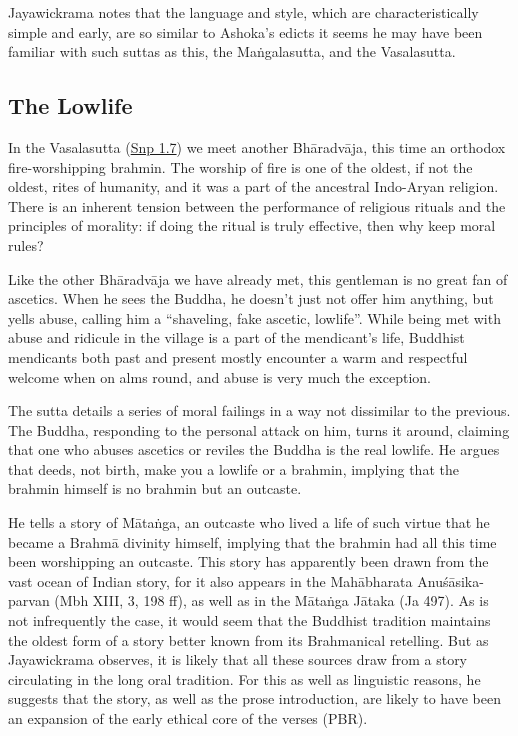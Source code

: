 \documentclass[12pt,openany]{book}%
\begin{document}
Jayawickrama notes that the language and style, which are characteristically simple and early, are so similar to Ashoka’s edicts it seems he may have been familiar with such suttas as this, the \textsanskrit{Maṅgalasutta}, and the Vasalasutta.

\subsection*{The Lowlife}

In the Vasalasutta (\href{https://suttacentral.net/snp1.7/en/sujato}{Snp 1.7}) we meet another \textsanskrit{Bhāradvāja}, this time an orthodox fire-worshipping brahmin. The worship of fire is one of the oldest, if not the oldest, rites of humanity, and it was a part of the ancestral Indo-Aryan religion. There is an inherent tension between the performance of religious rituals and the principles of morality: if doing the ritual is truly effective, then why keep moral rules?

Like the other \textsanskrit{Bhāradvāja} we have already met, this gentleman is no great fan of ascetics. When he sees the Buddha, he doesn’t just not offer him anything, but yells abuse, calling him a “shaveling, fake ascetic, lowlife”. While being met with abuse and ridicule in the village is a part of the mendicant’s life, Buddhist mendicants both past and present mostly encounter a warm and respectful welcome when on alms round, and abuse is very much the exception.

The sutta details a series of moral failings in a way not dissimilar to the previous. The Buddha, responding to the personal attack on him, turns it around, claiming that one who abuses ascetics or reviles the Buddha is the real lowlife. He argues that deeds, not birth, make you a lowlife or a brahmin, implying that the brahmin himself is no brahmin but an outcaste.

He tells a story of \textsanskrit{Mātaṅga}, an outcaste who lived a life of such virtue that he became a \textsanskrit{Brahmā} divinity himself, implying that the brahmin had all this time been worshipping an outcaste. This story has apparently been drawn from the vast ocean of Indian story, for it also appears in the \textsanskrit{Mahābharata} \textsanskrit{Anuśāsika}-parvan (Mbh XIII, 3, 198 ff), as well as in the \textsanskrit{Mātaṅga} \textsanskrit{Jātaka} (Ja 497). As is not infrequently the case, it would seem that the Buddhist tradition maintains the oldest form of a story better known from its Brahmanical retelling. But as Jayawickrama observes, it is likely that all these sources draw from a story circulating in the long oral tradition. For this as well as linguistic reasons, he suggests that the story, as well as the prose introduction, are likely to have been an expansion of the early ethical core of the verses (PBR).
\end{document}
